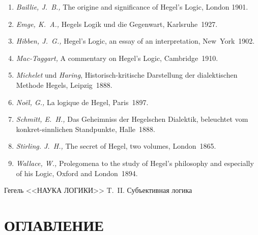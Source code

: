 \begin{enumerate}
\item{\em Baillie, J.~B.,} The origine and significance of Hegel's Logic,
London 1901.
\item{\em Emge, K.~A.,} Hegels Logik und die Gegenwart, Karlsruhe~1927.
\item{\em Hibben, J.~G.,} Hegel's Logic, an essay of an interpretation,
New~York~1902.
\item{\em Mac-Taggart,} A commentary on Hegel's Logic, Cambridge~1910.
\item{\em Michelet} und {\em Haring}, Historisch-kritische Darstellung
der dialektischen Methode Hegels, Leipzig~1888.
\item{\em Noël, G.,} La logique de Hegel, Paris~1897.
\item{\em Schmitt, E.~H.,} Das Geheimniss der Hegelschen Dialektik, beleuchtet
vom konkret-sinnlichen Standpunkte, Halle~1888.
\item{\em Stirling. J.~H.,} The secret of Hegel, two volumes, London~1865.
\item{\em Wallace, W.,} Prolegomena to the study of Hegel's philosophy and
especially of his Logic, Oxford and London~1894.
\end{enumerate}

\clearpage
\bigskip
\printpagenotes
\bigskip
\bigskip

{\centering Гегель <<НАУКА ЛОГИКИ>> T.~II. Субъективная логика \par}

\renewcommand\contentsname{}
\section*[Оглавление]{ОГЛАВЛЕНИЕ}
\tableofcontents

\bigskip
\clearpage
\bigskip
